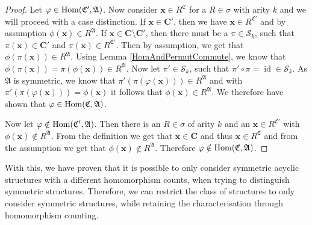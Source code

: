\begin{proof}
	Let $\varphi\in \operatorname{Hom}(\mathfrak C',\mathfrak A)$.
	Now consider $\mathbf x\in R^{\mathfrak C}$ for a $R\in \sigma$ with arity $k$ and we will proceed with a case distinction.
	If $\mathbf x\in \mathbf{C'}$, then we have $\mathbf x\in R^{\mathfrak C'}$ and by assumption $\phi(\mathbf x)\in R^{\mathfrak A}$.
	If $\mathbf x\in \mathbf C\setminus\mathbf{C'}$, then there must be a $\pi\in \mathcal S_k$, such that $\pi(\mathbf x)\in \mathbf{C'}$ and $\pi(\mathbf x)\in R^{\mathfrak C'}$.
	Then by assumption, we get that $\phi(\pi(\mathbf x))\in R^{\mathfrak A}$.
	Using Lemma \ref{HomAndPermutCommute}, we know that $\phi(\pi(\mathbf x))=\pi(\phi(\mathbf x))\in R^{\mathfrak A}$.
	Now let $\pi'\in \mathcal S_k$, such that $\pi'\circ\pi=\operatorname{id}\in \mathcal S_k$.
	As $\mathfrak A$ is symmetric, we know that $\pi'(\pi(\varphi(\mathbf x)))\in R^{\mathfrak A}$ and with $\pi'(\pi(\varphi(\mathbf x)))=\phi(\mathbf x)$ it follows that $\phi(\mathbf x)\in R^{\mathfrak A}$.
	We therefore have shown that $\varphi\in\operatorname{Hom}(\mathfrak C,\mathfrak A)$.
	
	Now let $\varphi\notin\operatorname{Hom}(\mathfrak C',\mathfrak A)$.
	Then there is an $R\in\sigma$ of arity $k$ and an $\mathbf x\in R^{\mathfrak C'}$ with $\phi(\mathbf x)\notin R^{\mathfrak A}$.
	From the definition we get that $\mathbf x\in \mathbf{C}$ and thus $\mathbf x \in R^{\mathfrak C}$ and from the assumption we get that $\phi(\mathbf x)\notin R^{\mathfrak A}$.
	Therefore $\varphi\notin \operatorname{Hom}(\mathfrak C,\mathfrak A)$.
\end{proof}

With this, we have proven that it is possible to only consider symmetric acyclic structures with a different homomorphism counts, when trying to distinguish symmetric structures.
Therefore, we can restrict the class of structures to only consider symmetric structures, while retaining the characterisation through homomorphism counting.



